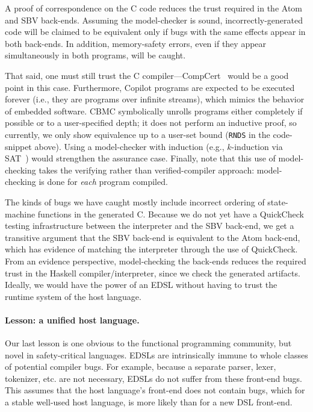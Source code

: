 \documentclass[preprint]{sigplanconf}
\begin{document}
A proof of correspondence on the C code reduces the trust required in the Atom
and SBV back-ends.  Assuming the model-checker is sound, incorrectly-generated
code will be claimed to be equivalent only if bugs with the same effects appear
in both back-ends.  In addition, memory-safety errors, even if they appear
simultaneously in both programs, will be caught.

That said, one must still trust the C compiler---CompCert~\cite{leroy} would be
a good point in this case.  Furthermore, Copilot programs are expected to be
executed forever (i.e., they are programs over infinite streams), which mimics
the behavior of embedded software.  CBMC symbolically unrolls programs either
completely if possible or to a user-specified depth; it does not perform an
inductive proof, so currently, we only show equivalence up to a user-set bound
({\tt RNDS} in the code-snippet above).  Using a model-checker with induction
(e.g., $k$-induction via SAT~\cite{sheeran,tinelli}) would strengthen the
assurance case.  Finally, note that this use of model-checking takes the
verifying rather than verified-compiler approach: model-checking is done for
\emph{each} program compiled.

The kinds of bugs we have caught mostly include incorrect ordering of
state-machine functions in the generated C.  Because we do not yet have a
QuickCheck testing infrastructure between the interpreter and the SBV back-end,
we get a transitive argument that the SBV back-end is equivalent to the Atom
back-end, which has evidence of matching the interpreter through the use of
QuickCheck.  From an evidence perspective, model-checking the back-ends reduces
the required trust in the Haskell compiler/interpreter, since we check the generated
artifacts.  Ideally, we would have the power of an EDSL without having to trust
the runtime system of the host language.



\paragraph{Lesson: a unified host language.}
Our last lesson is one obvious to the functional programming community, but
novel in safety-critical languages.  EDSLs are intrinsically immune to whole classes of
potential compiler bugs.  For example, because a separate parser, lexer,
tokenizer, etc. are not necessary, EDSLs do not suffer from these front-end
bugs.  This assumes that the host language's front-end does not contain bugs,
which for a stable well-used host language, is more likely than for a new DSL
front-end.  
\end{document}
